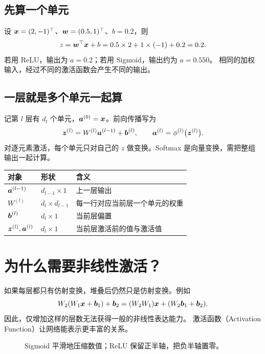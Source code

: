 \subsection{先算一个单元}
设 $\boldsymbol{x}=(2,-1)^\top$、$\boldsymbol{w}=(0.5,1)^\top$、$b=0.2$，则
\[
 z=\boldsymbol{w}^\top\boldsymbol{x}+b=0.5\times2+1\times(-1)+0.2=0.2.
\]
若用 ReLU，输出为 $a=0.2$；若用 Sigmoid，输出约为 $a=0.550$。
相同的加权输入，经过不同的激活函数会产生不同的输出。

\subsection{一层就是多个单元一起算}
记第 $l$ 层有 $d_l$ 个单元，$\boldsymbol{a}^{(0)}=\boldsymbol{x}$。前向传播写为
\begin{equation}
 \boldsymbol{z}^{(l)}=W^{(l)}\boldsymbol{a}^{(l-1)}+\boldsymbol{b}^{(l)},\qquad
 \boldsymbol{a}^{(l)}=\phi^{(l)}\bigl(\boldsymbol{z}^{(l)}\bigr).
 \label{eq:nn-forward}
\end{equation}
对逐元素激活，每个单元只对自己的 $z$ 做变换。Softmax 是向量变换，需把整组输出一起计算。

\begin{center}
\small
\begin{tabularx}{0.96\textwidth}{l l X}
\toprule
对象 & 形状 & 含义\\
\midrule
$\boldsymbol{a}^{(l-1)}$ & $d_{l-1}\times1$ & 上一层输出\\
$W^{(l)}$ & $d_l\times d_{l-1}$ & 每一行对应当前层一个单元的权重\\
$\boldsymbol{b}^{(l)}$ & $d_l\times1$ & 当前层偏置\\
$\boldsymbol{z}^{(l)},\boldsymbol{a}^{(l)}$ & $d_l\times1$ & 当前层激活前的值与激活值\\
\bottomrule
\end{tabularx}
\end{center}


\section{为什么需要非线性激活？}
\label{sec:nn-activations}

如果每层都只有仿射变换，堆叠后仍然只是仿射变换。例如
\[
 W_2(W_1\boldsymbol{x}+\boldsymbol{b}_1)+\boldsymbol{b}_2
   =(W_2W_1)\boldsymbol{x}+(W_2\boldsymbol{b}_1+\boldsymbol{b}_2).
\]
因此，仅增加这样的层数无法获得一般的非线性表达能力。
激活函数（Activation Function）让网络能表示更丰富的关系。

\begin{figure}[htbp]
\centering

\caption{Sigmoid 平滑地压缩数值；ReLU 保留正半轴，把负半轴置零。}
\label{fig:activations}
\par\smallskip
{}
\end{figure}


